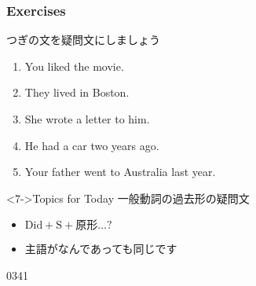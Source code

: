 \documentclass[aspectratio=169,xcolor={dvipsnames,table}]{beamer}
\newcommand{\myaudio}[1]{\href{#1}{\faVolumeUp}}
\begin{document}
\begin{frame}[plain]\frametitle{Exercises}

\small {つぎの文を疑問文にしましょう}

 \begin{enumerate}
  \item<1-> You liked the movie.\hspace{59.7pt}
  \item<1-> They lived in Boston.\hspace{62pt}%
  \item<1-> She wrote a letter to him.\hspace{42pt}%
  \item<1-> He had  a car two years ago.\hspace{30.5pt}%
  \item<1-> Your father went to  Australia last year.\\
 \mbox{}\hfill{}
 \end{enumerate}

\begin{block}<7->{Topics for Today}
\small
一般動詞の過去形の疑問文
\begin{itemize}[square]
 \item  \textcolor{NavyBlue}{\bfseries $\text{Did} + \text{S} + \text{原形} \ldots ?$}
 \item  主語がなんであっても同じです
\end{itemize}
      \end{block}

\vspace{-10pt}
\mbox{}\hfill{\tiny 0341}\,{\scriptsize \myaudio{./audio/027_past_did_you_04.mp3}}


\end{frame}
\end{document}
